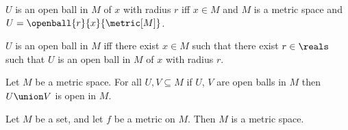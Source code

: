 \begin{abbreviation}\label{descriptive_syntax_for_openball1}
    $U$ is an open ball in $M$ of $x$ with radius $r$ iff $x \in M$ and $M$ is a metric space and $U = \openball{r}{x}{\metric[M]}$.
\end{abbreviation}

\begin{abbreviation}\label{descriptive_syntax_for_openball2}
    $U$ is an open ball in $M$ iff there exist $x \in M$ such that there exist $r \in \reals$ such that $U$ is an open ball in $M$ of $x$ with radius $r$.
\end{abbreviation}

\begin{lemma}\label{union_of_open_balls_is_open}
    Let $M$ be a metric space.
    For all $U,V \subseteq M$ if $U$, $V$ are open balls in $M$ then $U \union V$ is open in $M$.
\end{lemma}




\begin{lemma}\label{metric_implies_topology}
    Let $M$ be a set, and let $f$ be a metric on $M$.
    Then $M$ is a metric space.
\end{lemma}


